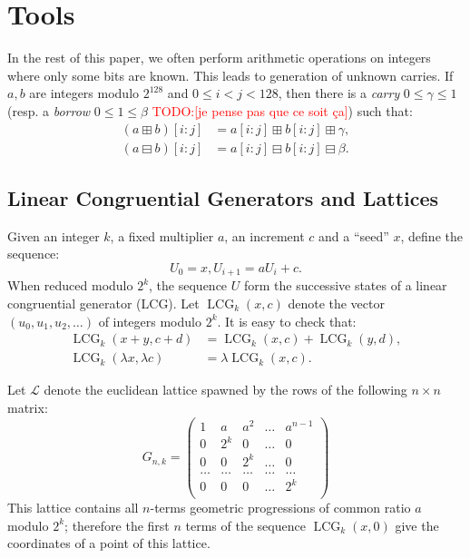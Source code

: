 \documentclass[submission,svgnames,journal=tosc]{iacrtrans}
\DeclareMathOperator{\LCG}{LCG}
\newcommand{\todo}[1]{\textcolor{red}{TODO:[#1]}}
\begin{document}
\section{Tools}
\label{sec:geometric}

In the rest of this paper, we often perform arithmetic operations on integers
where only some bits are known. This leads to generation of unknown carries. If
$a, b$ are integers modulo $2^{128}$ and $0\leq i<j<128$, then there is a
\emph{carry} $0 \leq \gamma \leq 1$ (resp. a \emph{borrow}
$0 \leq 1 \leq \beta$ \todo{je pense pas que ce soit ça}) such that:
\begin{align}
  (a \boxplus b)[i:j]  &= a[i:j] \boxplus  b[i:j] \boxplus  \gamma, \label{eq:caryy}  \\
  (a \boxminus b)[i:j] &= a[i:j] \boxminus b[i:j] \boxminus \beta.  \label{eq:borrow}
\end{align}

\subsection{Linear Congruential Generators and Lattices}

Given an integer $k$, a fixed multiplier $a$, an increment $c$ and a ``seed''
$x$, define the sequence:
\[
  U_0 = x, U_{i+1} = a U_i + c.
\]
When reduced modulo $2^k$, the sequence $U$ form the successive states of a
linear congruential generator (LCG). Let $\LCG_{k}(x, c)$ denote the vector
$(u_0, u_1, u_2, \dots)$ of integers modulo $2^k$. It is easy to check that:
\begin{align}
\label{eq:lcg-additive}
\LCG_{k}(x + y, c + d) &= \LCG_{k}(x, c) + \LCG_{k}(y, d),  \\
\label{eq:lcg-scalar}
\LCG_{k}(\lambda x, \lambda c) &= \lambda \LCG_{k}(x, c).   
\end{align}

Let $\mathcal{L}$ denote the euclidean lattice spawned by the rows of the
following $n\times n$ matrix:
\[
  G_{n,k} = \begin{pmatrix}
    1 & a   & a^2 & \dots & a^{n-1} \\
    0 & 2^k & 0   & \dots & 0 \\
    0 & 0   & 2^k & \dots & 0 \\
    \dots & \dots & \dots & \dots & \dots\\
    0 & 0 & 0 & \dots & 2^k \\
  \end{pmatrix}
\]
This lattice contains all $n$-terms geometric progressions of common ratio $a$
modulo $2^k$; therefore the first $n$ terms of the sequence $\LCG_{k}(x, 0)$
give the coordinates of a point of this lattice.
\end{document}
